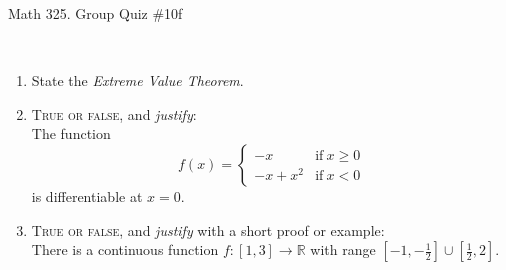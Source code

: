 \documentclass[12pt]{amsart}
\newcommand{\R}{\mathbb{R}}
\begin{document}
	
	\thispagestyle{empty}
	
	\begin{center}
		\Large{Math 325. Group Quiz \#10f }\\

	\end{center}
	
	\
	
\begin{enumerate}
		\item State the \textit{Extreme Value Theorem}. 
		\vfill
		\vfill



\item  \textsc{True or false}, and \emph{justify}:\\
 The function 
 \[ f(x) = \begin{cases} - x & \text{if} \ x\geq 0 \\ -x + x^2 & \text{if} \ x<0 \end{cases}\]
	is differentiable at $x=0$.
	
	
	\vfill	\vfill\vfill
	

\newpage	
	
\item  \textsc{True or false}, and \emph{justify} with a short proof or example:\\
There is a continuous function $f: [1,3] \to \R$ with range $[-1,-\frac{1}{2}] \cup [\frac{1}{2},2]$.

\vfill\vfill\vfill





\end{enumerate}


	
\end{document}

